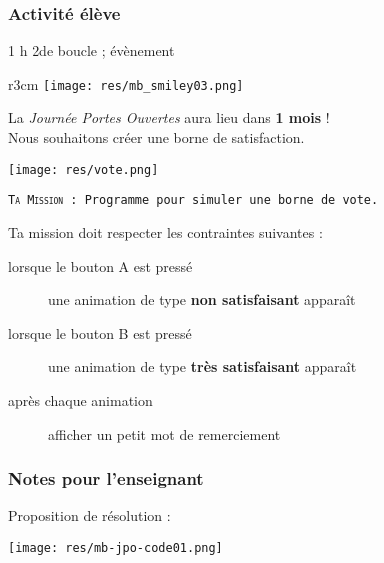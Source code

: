 \subsubsection{Activité élève}

\cartouche
{1 h}         %
{2de}           %
{}        %
{}     %
{boucle ; évènement}       %


\begin{wrapfigure}[4]{r}{3cm}
    \texttt{[image: res/mb\_smiley03.png]}
\end{wrapfigure}

\begin{eleve}
    La \textit{Journée Portes Ouvertes} aura lieu dans \textbf{1 mois} !\\
    Nous souhaitons créer une borne de satisfaction.
    \begin{center}
        \texttt{[image: res/vote.png]}
    \end{center}
    
    \vspace{1em}
    \texttt{\textsc{Ta Mission} : Programme \mb pour simuler une borne de vote.}
    \vspace{1em}
    
    Ta mission doit respecter les contraintes suivantes :
    \begin{description}
        \item[lorsque le bouton A est pressé] une animation de type \textbf{non satisfaisant} apparaît
        \item[lorsque le bouton B est pressé] une animation de type \textbf{très satisfaisant} apparaît
        \item[après chaque animation] afficher un petit mot de remerciement
    \end{description}
\end{eleve}

\newpage

\subsubsection{Notes pour l'enseignant}

%
%
\begin{methode}
Proposition de résolution :

\texttt{[image: res/mb-jpo-code01.png]}
\end{methode}


